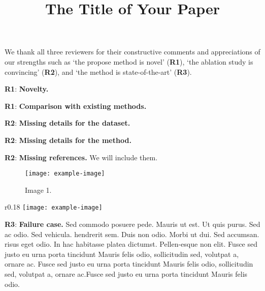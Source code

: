 \documentclass[10pt,twocolumn,letterpaper]{article}
\newcommand{\Rone}{\vspace{0.0em}\noindent \textcolor[RGB]{0, 123, 167}{\textbf{R1}\hspace{0.0em}}}
\newcommand{\Rtwo}{\vspace{0.0em}\noindent \textcolor[RGB]{204, 85, 0}{\textbf{R2}\hspace{0.0em}}}
\newcommand{\Rthree}{\vspace{0.0em}\noindent \textcolor[RGB]{0, 128, 0}{\textbf{R3}\hspace{0.0em}}}
\begin{document}
\title{The Title of Your Paper}

\maketitle

\thispagestyle{empty}
\appendix

We thank all three reviewers for their constructive comments and appreciations of our strengths such as `the propose method is novel' (\Rone), `the ablation study is convincing' (\Rtwo), and `the method is state-of-the-art' (\Rthree).


\begin{table}[t]
\centering
\caption{Table 1.}
\label{tab:table}
    \vspace{-1em}
\end{table}

\Rone: \textbf{Novelty.}
\lipsum[1]

\Rone: \textbf{Comparison with existing methods.}
\lipsum[2]

\Rtwo: \textbf{Missing details for the dataset.}
\lipsum[3]

\Rtwo: \textbf{Missing details for the method.}
\lipsum[4]

\Rtwo: \textbf{Missing references.}
We will include them. 

\begin{figure}[tb] \centering
    \texttt{[image: example-image]}
    \caption{Image 1.} \label{fig:img1}
    \vspace{-1em}
\end{figure}

\begin{wrapfigure}{r}{0.18\textwidth} 
    \vspace{-1.0em}
    \centering
    \texttt{[image: example-image]}
    \label{tab:geo}
    \vspace{-1.1em}
\end{wrapfigure}
\Rthree: \textbf{Failure case.}
Sed commodo posuere pede. Mauris ut est. Ut quis purus. Sed ac odio. Sed vehicula. hendrerit sem. Duis non odio. Morbi ut dui. Sed accumsan. risus eget odio. In hac habitasse platea dictumst. Pellen-esque non elit. Fusce sed justo eu urna porta tincidunt Mauris felis odio, sollicitudin sed, volutpat a, ornare ac. Fusce sed justo eu urna porta tincidunt Mauris felis odio, sollicitudin sed, volutpat a, ornare ac.Fusce sed justo eu urna porta tincidunt Mauris felis odio.
\end{document}

